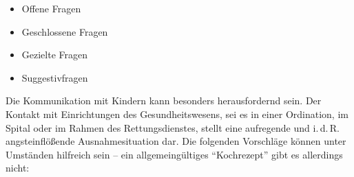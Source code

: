 \documentclass[
ngerman,
paper=a4,
asymmetric,
fontsize=10pt,
draft=false,
numbers=noenddot,
bibtotocnumbered,
footnotes=multiple,
]{scrreprt}
\begin{document}
{
\begin{itemize}
    \item Offene Fragen
    \item Geschlossene Fragen
    \item Gezielte Fragen
    \item Suggestivfragen 
\end{itemize}
}{}{}{}

{Die Kommunikation mit Kindern kann besonders herausfordernd
sein. Der Kontakt mit Einrichtungen des Gesundheitswesens,
sei es in einer Ordination, im Spital oder im Rahmen des
Rettungsdienstes, stellt eine aufregende und i.\,d.\,R.
angsteinflößende Ausnahmesituation dar. Die folgenden
Vorschläge können unter Umständen hilfreich sein -- ein
allgemeingültiges \enquote{Kochrezept} gibt es allerdings nicht:

}
\end{document}
